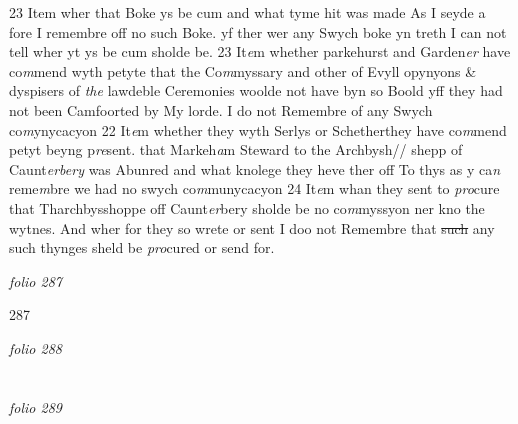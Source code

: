 \documentclass[12pt, a4paper]{book}
\begin{document}
23 Item wher that Boke ys be cum and what tyme hit was made As I seyde a fore I remembre off no such Boke. yf ther wer any Swych boke yn treth I can not tell wher yt ys be cum
			 sholde be.   23 It\textit{e}m whether parkehurst and Garden\textit{er} have co\textit{m}mend wyth petyte that the Co\textit{m}myssary and other of Evyll opynyons \& dyspisers of \textit{the} lawdeble Ceremonies woolde not have byn so Boold yff they had not been Camfoorted by My lorde.   I do not Remembre of any Swych co\textit{m}ynycacyon  22 It\textit{e}m whether they wyth Serlys or Schetherthey have co\textit{m}mend petyt beyng p\textit{re}sent. that Markeh\textit{a}m Steward to the Archbysh// shepp of Caunt\textit{erbery} was Abunred and what knolege they heve ther off To thys as y ca\textit{n} reme\textit{m}bre we had no swych co\textit{m}munycacyon  24 It\textit{e}m whan they sent to \textit{pro}cure that Tharchbysshoppe off Caunt\textit{er}bery sholde be no co\textit{m}myssyon ner kno the wytnes. And wher for they so wrete or sent I doo not Remembre that \sout{such }any such thynges sheld be  \textit{pro}cured or send for.

\dotfill
					

\textit{folio 287}


{\color{Mahogany}287}

\dotfill
					

\textit{folio 288}


         \vspace{4cm}
         
\dotfill
					  \section*{}  \subsection*{}

\textit{folio 289}
\end{document}

